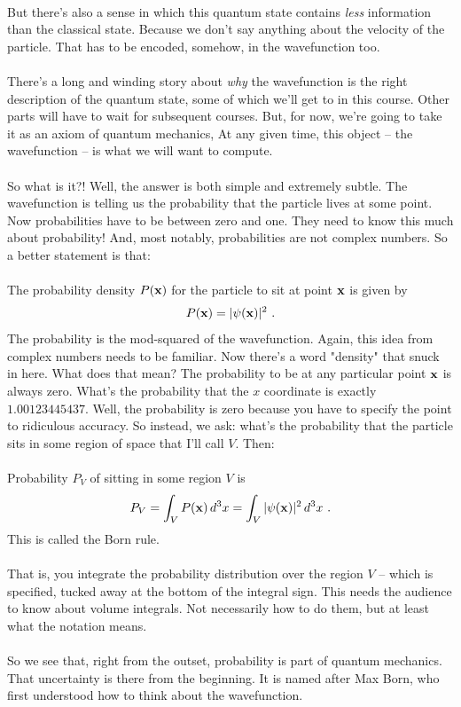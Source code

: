 \documentclass[12pt]{article}
\def\be{\begin{eqnarray}}
\def\ee{\end{eqnarray}}
\newcommand{\nn}{\nonumber}
\newcommand\para{\paragraph{}}
\newcommand{\bx}{{\bf x}}
\begin{document}
\para
But there's also a sense in which this quantum state contains {\it less} information than the classical state. Because we don't say anything about the velocity of the particle. That has to be encoded, somehow, in the wavefunction too. 

\para
There's a long and winding story about {\it why} the wavefunction is the right description of the quantum state, some of which we'll get to in this course. Other parts will have to wait for subsequent courses. But, for now, we're going to take it as an axiom of quantum mechanics, At any given time, this object -- the wavefunction -- is what we will want to compute. 

\para
So what is it?! Well, the answer is both simple and extremely subtle. The wavefunction is telling us the probability that the particle lives at some point. Now probabilities have to be between zero and one. {\color{blue} They need to know this much about probability!} And, most notably, probabilities are not complex numbers. So a better statement is that:

\para
{\color{olive}The probability density $P(\bx)$ for the particle to sit at point $\bx$ is given by 
%
\be P(\bx) = |\psi(\bx)|^2\ .\nn\ee}
%
The probability is the mod-squared of the wavefunction. {\color{blue} Again, this idea from complex numbers needs to be familiar.} Now there's a word "density" that snuck in here. What does that mean? The probability to be at any particular point $\bx$ is always zero. What's the probability that the $x$ coordinate is exactly $1.00123445437$. Well, the probability is zero because you have to specify the point to ridiculous accuracy. So instead, we ask: what's the probability that the particle sits in some region of space that I'll call $V$. Then:

\para
{\color{olive} Probability $P_V$ of sitting in some region $V$ is
%
\be P_V = \int_V  P(\bx) \,d^3x = \int_V |\psi(\bx)|^2 \,d^3x\ .\nn\ee
%
This is called the Born rule.}

\para
That is, you integrate the probability distribution over the region $V$ -- which is specified, tucked away at the bottom of the integral sign. {\color{blue} This needs the audience to know about volume integrals. Not necessarily how to do them, but at least what the notation means.}

\para
So we see that, right from the outset, probability is part of quantum mechanics. That uncertainty is there from the beginning. It is named after Max Born, who first understood how to think about the wavefunction. 
\end{document}
